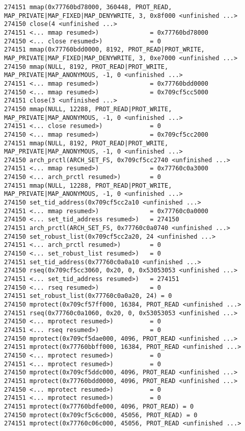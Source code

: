 \begin{verbatim}
274151 mmap(0x77760bd78000, 360448, PROT_READ, MAP_PRIVATE|MAP_FIXED|MAP_DENYWRITE, 3, 0x8f000 <unfinished ...>
274150 close(4 <unfinished ...>
274151 <... mmap resumed>)              = 0x77760bd78000
274150 <... close resumed>)             = 0
274151 mmap(0x77760bdd0000, 8192, PROT_READ|PROT_WRITE, MAP_PRIVATE|MAP_FIXED|MAP_DENYWRITE, 3, 0xe7000 <unfinished ...>
274150 mmap(NULL, 8192, PROT_READ|PROT_WRITE, MAP_PRIVATE|MAP_ANONYMOUS, -1, 0 <unfinished ...>
274151 <... mmap resumed>)              = 0x77760bdd0000
274150 <... mmap resumed>)              = 0x709cf5cc5000
274151 close(3 <unfinished ...>
274150 mmap(NULL, 12288, PROT_READ|PROT_WRITE, MAP_PRIVATE|MAP_ANONYMOUS, -1, 0 <unfinished ...>
274151 <... close resumed>)             = 0
274150 <... mmap resumed>)              = 0x709cf5cc2000
274151 mmap(NULL, 8192, PROT_READ|PROT_WRITE, MAP_PRIVATE|MAP_ANONYMOUS, -1, 0 <unfinished ...>
274150 arch_prctl(ARCH_SET_FS, 0x709cf5cc2740 <unfinished ...>
274151 <... mmap resumed>)              = 0x77760c0a3000
274150 <... arch_prctl resumed>)        = 0
274151 mmap(NULL, 12288, PROT_READ|PROT_WRITE, MAP_PRIVATE|MAP_ANONYMOUS, -1, 0 <unfinished ...>
274150 set_tid_address(0x709cf5cc2a10 <unfinished ...>
274151 <... mmap resumed>)              = 0x77760c0a0000
274150 <... set_tid_address resumed>)   = 274150
274151 arch_prctl(ARCH_SET_FS, 0x77760c0a0740 <unfinished ...>
274150 set_robust_list(0x709cf5cc2a20, 24 <unfinished ...>
274151 <... arch_prctl resumed>)        = 0
274150 <... set_robust_list resumed>)   = 0
274151 set_tid_address(0x77760c0a0a10 <unfinished ...>
274150 rseq(0x709cf5cc3060, 0x20, 0, 0x53053053 <unfinished ...>
274151 <... set_tid_address resumed>)   = 274151
274150 <... rseq resumed>)              = 0
274151 set_robust_list(0x77760c0a0a20, 24) = 0
274150 mprotect(0x709cf57ff000, 16384, PROT_READ <unfinished ...>
274151 rseq(0x77760c0a1060, 0x20, 0, 0x53053053 <unfinished ...>
274150 <... mprotect resumed>)          = 0
274151 <... rseq resumed>)              = 0
274150 mprotect(0x709cf5dae000, 4096, PROT_READ <unfinished ...>
274151 mprotect(0x77760bbff000, 16384, PROT_READ <unfinished ...>
274150 <... mprotect resumed>)          = 0
274151 <... mprotect resumed>)          = 0
274150 mprotect(0x709cf5ddc000, 4096, PROT_READ <unfinished ...>
274151 mprotect(0x77760bdd0000, 4096, PROT_READ <unfinished ...>
274150 <... mprotect resumed>)          = 0
274151 <... mprotect resumed>)          = 0
274151 mprotect(0x77760bdfe000, 4096, PROT_READ) = 0
274150 mprotect(0x709cf5c6c000, 45056, PROT_READ) = 0
274151 mprotect(0x77760c06c000, 45056, PROT_READ <unfinished ...>

\end{verbatim}
